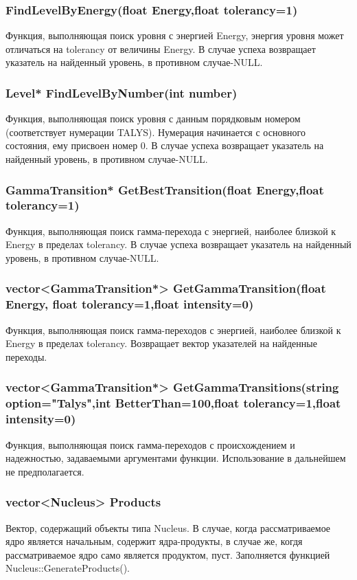 \documentclass[a4paper,12pt]{extarticle}
\begin{document}
\subsubsection{FindLevelByEnergy(float Energy,float tolerancy=1)}
Функция, выполняющая поиск уровня с энергией Energy, энергия уровня может отличаться на tolerancy от величины Energy. В случае успеха возвращает указатель на найденный уровень, в противном случае-NULL.
\subsubsection{Level* FindLevelByNumber(int number)}
Функция, выполняющая поиск уровня с данным порядковым номером (соответствует нумерации TALYS). Нумерация начинается с основного состояния, ему присвоен номер 0. В случае успеха возвращает указатель на найденный уровень, в противном случае-NULL.
\subsubsection{GammaTransition* GetBestTransition(float Energy,float tolerancy=1)}
Функция, выполняющая поиск гамма-перехода с энергией, наиболее близкой к Energy в пределах tolerancy. В случае успеха возвращает указатель на найденный уровень, в противном случае-NULL.
\subsubsection{vector<GammaTransition*> GetGammaTransition(float Energy, float tolerancy=1,float intensity=0)}
Функция, выполняющая поиск гамма-переходов с энергией, наиболее близкой к Energy в пределах tolerancy. Возвращает вектор указателей на найденные переходы.
\subsubsection{vector<GammaTransition*> GetGammaTransitions(string option="Talys",int BetterThan=100,float tolerancy=1,float intensity=0)}
Функция, выполняющая поиск гамма-переходов с происхождением и надежностью, задаваемыми аргументами функции. Использование в дальнейшем не предполагается.
\subsubsection{vector<Nucleus> Products}
Вектор, содержащий объекты типа Nucleus. В случае, когда рассматриваемое ядро является начальным, содержит ядра-продукты, в случае же, когдя рассматриваемое ядро само является продуктом, пуст. Заполняется функцией Nucleus::GenerateProducts().
\end{document}
